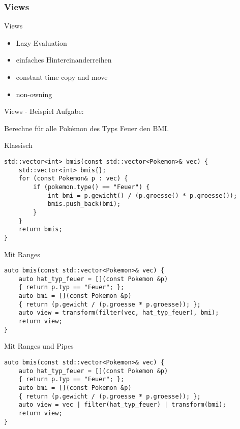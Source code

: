 \subsubsection{Views}

\begin{frame}{Views}
    \begin{itemize}
        \item<1-> Lazy Evaluation
        \item<2-> einfaches Hintereinanderreihen
        \item<3-> constant time copy and move
        \item<4-> non-owning
    \end{itemize}
\end{frame}

\begin{frame}{Views - Beispiel}
    Aufgabe:

    Berechne für alle Pokémon des Typs Feuer den BMI.
\end{frame}

\begin{frame}[fragile]{Klassisch}
    \begin{verbatim}
std::vector<int> bmis(const std::vector<Pokemon>& vec) {
    std::vector<int> bmis{};
    for (const Pokemon& p : vec) {
        if (pokemon.type() == "Feuer") {
            int bmi = p.gewicht() / (p.groesse() * p.groesse());
            bmis.push_back(bmi);
        }
    }
    return bmis;
}
\end{verbatim}
\end{frame}

\begin{frame}[fragile]{Mit Ranges}
    \begin{verbatim}
auto bmis(const std::vector<Pokemon>& vec) {
    auto hat_typ_feuer = [](const Pokemon &p)
    { return p.typ == "Feuer"; };
    auto bmi = [](const Pokemon &p)
    { return (p.gewicht / (p.groesse * p.groesse)); };
    auto view = transform(filter(vec, hat_typ_feuer), bmi);
    return view;
}
\end{verbatim}
\end{frame}

\begin{frame}[fragile]{Mit Ranges und Pipes}
    \begin{verbatim}
auto bmis(const std::vector<Pokemon>& vec) {
    auto hat_typ_feuer = [](const Pokemon &p)
    { return p.typ == "Feuer"; };
    auto bmi = [](const Pokemon &p)
    { return (p.gewicht / (p.groesse * p.groesse)); };
    auto view = vec | filter(hat_typ_feuer) | transform(bmi);
    return view;
}
\end{verbatim}
\end{frame}


